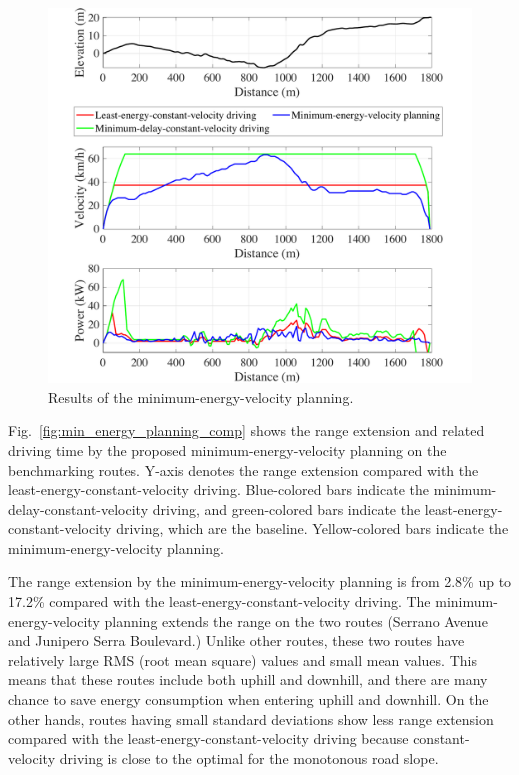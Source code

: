 \documentclass{IEEEtran}
\begin{document}
\begin{figure}[h]
\centering
\includegraphics[width=\hsize]{Figures/energy_driving_profile_best.pdf}
\caption{Results of the minimum-energy-velocity planning.}
\label{fig:no_deadline_trace}
\end{figure} 

Fig.~\ref{fig:min_energy_planning_comp} shows the range extension and related driving time by the proposed minimum-energy-velocity planning on the benchmarking routes. Y-axis denotes the range extension compared with the least-energy-constant-velocity driving. Blue-colored bars indicate the minimum-delay-constant-velocity driving, and green-colored bars indicate the least-energy-constant-velocity driving, which are the baseline. Yellow-colored bars indicate the minimum-energy-velocity planning.

The range extension by the minimum-energy-velocity planning is from 2.8\% up to 17.2\% compared with the least-energy-constant-velocity driving. 
The minimum-energy-velocity planning extends the range on the two routes (Serrano Avenue and Junipero Serra Boulevard.) Unlike other routes, these two routes have relatively large RMS (root mean square) values and small mean values. This means that these routes include both uphill and downhill, and there are many chance to save energy consumption when entering uphill and downhill. 
On the other hands, routes having small standard deviations show less range extension compared with the least-energy-constant-velocity driving because constant-velocity driving is close to the optimal for the monotonous road slope.
\end{document}
